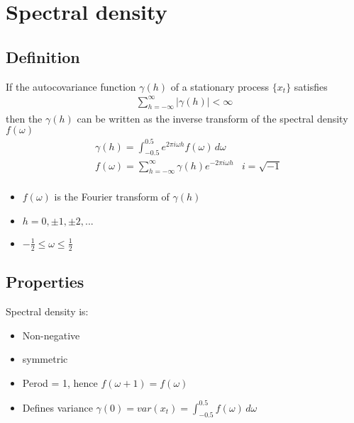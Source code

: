 \section{Spectral density} 
\subsection{Definition} 
If the autocovariance function $\gamma(h)$ of a stationary process $\{ x_t \}$ satisfies 
    \begin{align*}
        \sum_{h=-\infty}^\infty |\gamma(h)| < \infty 
    \end{align*}
then the $\gamma(h)$ can be written as the inverse transform of the spectral density $f(\omega)$
    \begin{align*}
        & \gamma(h) = \int_{-0.5}^0.5 e^{2\pi i \omega h} f(\omega) \,d \omega \\
        & f(\omega) = \sum_{h=-\infty}^\infty \gamma(h) e^{-2\pi i \omega h}
        & i = \sqrt{-1} \\
    \end{align*}
    \begin{itemize}
        \item $f(\omega)$ is the Fourier transform of $\gamma(h)$
        \item $h = 0, \pm 1, \pm 2, ...$
        \item $-\frac{1}{2} \leq \omega \leq \frac{1}{2}$
    \end{itemize}
\subsection{Properties}
Spectral density is: 
    \begin{itemize}
        \item Non-negative
        \item symmetric
        \item Perod = 1, hence $f(\omega + 1) = f(\omega)$
        \item Defines variance $\gamma(0) = var(x_t) = \int_{-0.5}^{0.5} f(\omega) \, d \omega$
    \end{itemize}
    


